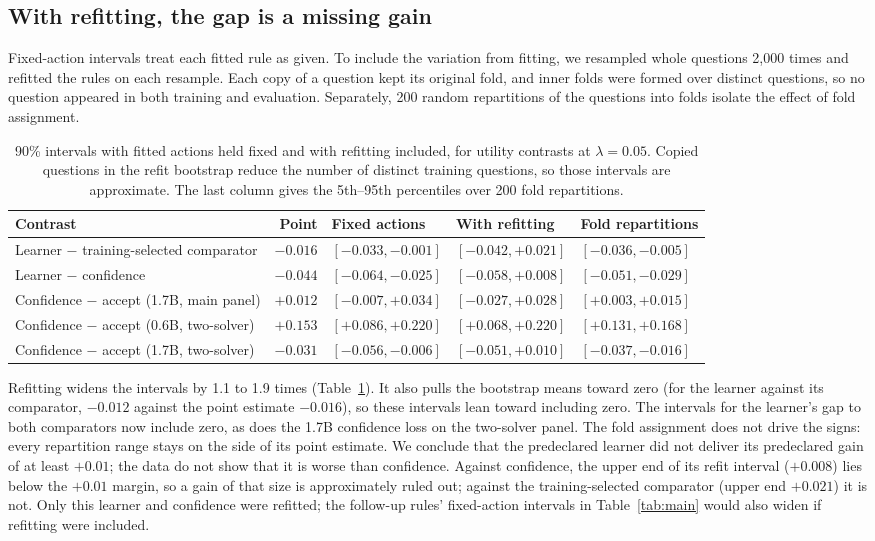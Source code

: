 \documentclass[10pt,letterpaper]{article}
\newcommand{\lam}{\lambda}
\begin{document}
\subsection{With refitting, the gap is a missing gain}

Fixed-action intervals treat each fitted rule as given. To include the variation from fitting, we resampled whole questions 2,000 times and refitted the rules on each resample. Each copy of a question kept its original fold, and inner folds were formed over distinct questions, so no question appeared in both training and evaluation. Separately, 200 random repartitions of the questions into folds isolate the effect of fold assignment.

\begin{table}[t]
\centering
\caption{90\% intervals with fitted actions held fixed and with refitting included, for utility contrasts at $\lam=0.05$. Copied questions in the refit bootstrap reduce the number of distinct training questions, so those intervals are approximate. The last column gives the 5th--95th percentiles over 200 fold repartitions.}
\label{tab:refit}
\small
\begin{tabular}{@{}lrlll@{}}
\toprule
Contrast & Point & Fixed actions & With refitting & Fold repartitions \\
\midrule
Learner $-$ training-selected comparator & $-0.016$ & $[-0.033, -0.001]$ & $[-0.042, +0.021]$ & $[-0.036, -0.005]$ \\
Learner $-$ confidence & $-0.044$ & $[-0.064, -0.025]$ & $[-0.058, +0.008]$ & $[-0.051, -0.029]$ \\
Confidence $-$ accept (1.7B, main panel) & $+0.012$ & $[-0.007, +0.034]$ & $[-0.027, +0.028]$ & $[+0.003, +0.015]$ \\
Confidence $-$ accept (0.6B, two-solver) & $+0.153$ & $[+0.086, +0.220]$ & $[+0.068, +0.220]$ & $[+0.131, +0.168]$ \\
Confidence $-$ accept (1.7B, two-solver) & $-0.031$ & $[-0.056, -0.006]$ & $[-0.051, +0.010]$ & $[-0.037, -0.016]$ \\
\bottomrule
\end{tabular}
\end{table}

Refitting widens the intervals by 1.1 to 1.9 times (Table~\ref{tab:refit}). It also pulls the bootstrap means toward zero (for the learner against its comparator, $-0.012$ against the point estimate $-0.016$), so these intervals lean toward including zero. The intervals for the learner's gap to both comparators now include zero, as does the 1.7B confidence loss on the two-solver panel. The fold assignment does not drive the signs: every repartition range stays on the side of its point estimate. We conclude that the predeclared learner did not deliver its predeclared gain of at least $+0.01$; the data do not show that it is worse than confidence. Against confidence, the upper end of its refit interval ($+0.008$) lies below the $+0.01$ margin, so a gain of that size is approximately ruled out; against the training-selected comparator (upper end $+0.021$) it is not. Only this learner and confidence were refitted; the follow-up rules' fixed-action intervals in Table~\ref{tab:main} would also widen if refitting were included.
\end{document}
